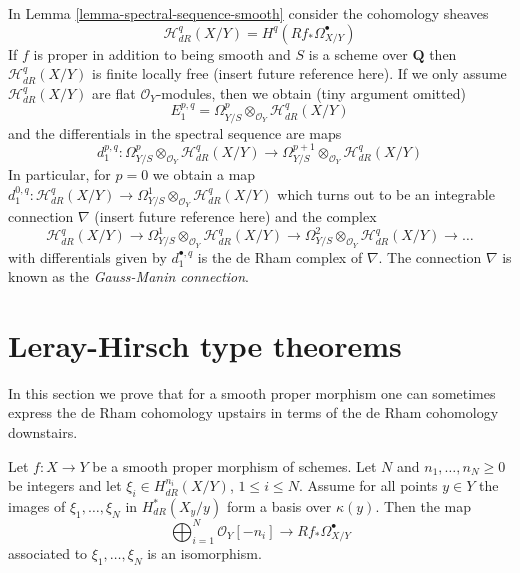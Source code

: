 \begin{remark}
\label{remark-gauss-manin}
In Lemma \ref{lemma-spectral-sequence-smooth} consider the cohomology sheaves
$$
\mathcal{H}^q_{dR}(X/Y) = H^q(Rf_*\Omega^\bullet_{X/Y})
$$
If $f$ is proper in addition to being smooth and $S$ is a scheme over
$\mathbf{Q}$ then $\mathcal{H}^q_{dR}(X/Y)$ is finite locally free (insert
future reference here). If we only assume $\mathcal{H}^q_{dR}(X/Y)$
are flat $\mathcal{O}_Y$-modules, then we obtain (tiny argument omitted)
$$
E_1^{p, q} =
\Omega^p_{Y/S} \otimes_{\mathcal{O}_Y} \mathcal{H}^q_{dR}(X/Y)
$$
and the differentials in the spectral sequence are maps
$$
d_1^{p, q} :
\Omega^p_{Y/S} \otimes_{\mathcal{O}_Y} \mathcal{H}^q_{dR}(X/Y)
\longrightarrow
\Omega^{p + 1}_{Y/S} \otimes_{\mathcal{O}_Y} \mathcal{H}^q_{dR}(X/Y)
$$
In particular, for $p = 0$ we obtain a map
$d_1^{0, q} : \mathcal{H}^q_{dR}(X/Y) \to
\Omega^1_{Y/S} \otimes_{\mathcal{O}_Y} \mathcal{H}^q_{dR}(X/Y)$
which turns out to be an integrable connection
$\nabla$ (insert future reference here)
and the complex
$$
\mathcal{H}^q_{dR}(X/Y) \to
\Omega^1_{Y/S} \otimes_{\mathcal{O}_Y} \mathcal{H}^q_{dR}(X/Y) \to
\Omega^2_{Y/S} \otimes_{\mathcal{O}_Y} \mathcal{H}^q_{dR}(X/Y) \to \ldots
$$
with differentials given by $d_1^{\bullet, q}$
is the de Rham complex of $\nabla$.
The connection $\nabla$ is known as the {\it Gauss-Manin connection}.
\end{remark}






\section{Leray-Hirsch type theorems}
\label{section-leray-hirsch}

\noindent
In this section we prove that for a smooth proper morphism one
can sometimes express the de Rham cohomology upstairs in terms
of the de Rham cohomology downstairs.

\begin{lemma}
\label{lemma-relative-global-generation-on-fibres}
Let $f : X \to Y$ be a smooth proper morphism of schemes.
Let $N$ and $n_1, \ldots, n_N \geq 0$ be integers and let
$\xi_i \in H^{n_i}_{dR}(X/Y)$, $1 \leq i \leq N$.
Assume for all points $y \in Y$ the images of $\xi_1, \ldots, \xi_N$
in $H^*_{dR}(X_y/y)$ form a basis over $\kappa(y)$. Then the map
$$
\bigoplus\nolimits_{i = 1}^N \mathcal{O}_Y[-n_i]
\longrightarrow
Rf_*\Omega^\bullet_{X/Y}
$$
associated to $\xi_1, \ldots, \xi_N$ is an isomorphism.
\end{lemma}

